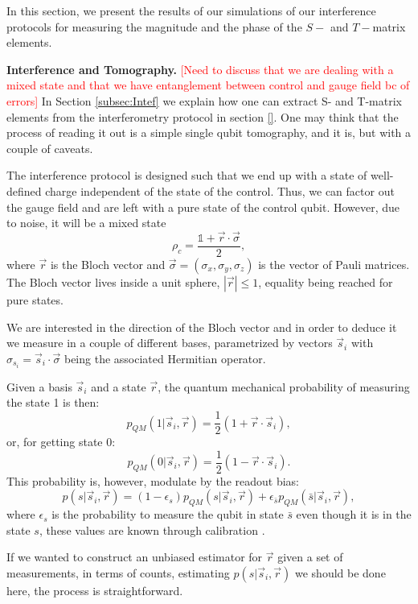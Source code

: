 \documentclass[two column]{article}
\newcommand{\caro}[1]{\textcolor{red}{[#1]}}
\begin{document}
In this section, we present the results of our simulations of our interference protocols for measuring the magnitude and the phase of the $S-$ and $T-$matrix elements. 

\textbf{Interference and Tomography.}
\caro{Need to discuss that we are dealing with a mixed state and that we have entanglement between control and gauge field bc of errors}
In Section \ref{subsec:Intef} we explain how one can extract  S- and T-matrix elements from the interferometry protocol in section \ref{}.
One may think that the process of reading it out is a simple single qubit tomography, and it is, but with a couple of caveats.

The interference protocol is designed such that we end up with a state of well-defined charge independent of the state of the control. Thus, we can factor out the gauge field and are left with a pure state of the control qubit. However, due to noise, it will be a mixed state \begin{equation}
    \rho_c = \frac{\mathbb{1} + \vec{r} \cdot \vec{\sigma}}{2},
\end{equation}
where $\vec{r}$ is the Bloch vector and $\vec{\sigma} = (\sigma_x, \sigma_y, \sigma_z)$ is the vector of Pauli matrices. The Bloch vector lives inside a unit sphere, $|\vec{r}|\leq 1$, equality being reached for pure states.

We are interested in the direction of the Bloch vector and in order to deduce it we measure in a couple of different bases, parametrized by vectors $\vec{s}_i$ with $\sigma_{s_i} = \vec{s}_i \cdot \vec{\sigma}$ being the associated Hermitian operator.

Given a basis $\vec{s}_i$ and a state $\vec{r}$, the quantum mechanical probability of measuring the state 1 is then: $$p_{QM}(1|\vec{s}_i, \vec{r}) = \frac{1}{2}(1+\vec{r}\cdot\vec{s}_i),$$ or, for getting state 0:
$$p_{QM}(0|\vec{s}_i, \vec{r}) = \frac{1}{2}(1-\vec{r}\cdot\vec{s}_i).$$
This probability is, however, modulate by the readout bias:
\begin{equation}
    p(s|\vec{s}_i, \vec{r}) = (1-\epsilon_s)p_{QM}(s|\vec{s}_i, \vec{r}) + \epsilon_{\bar{s}} p_{QM}(\bar{s}|\vec{s}_i, \vec{r}), \label{eqn:marg}
\end{equation}
where $\epsilon_s$ is the probability to measure the qubit in state $\bar{s}$ even though it is in the state $s$, these values are known through calibration \cite{}.

If we wanted to construct an unbiased estimator for $\vec{r}$ given a set of measurements, in terms of counts, estimating $p(s|\vec{s}_i, \vec{r})$ we should be done here, the process is straightforward.
\end{document}
